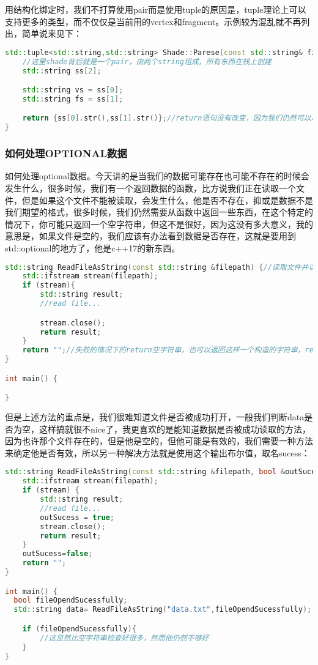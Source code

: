 用结构化绑定时，我们不打算使用pair而是使用tuple的原因是，tuple理论上可以支持更多的类型，而不仅仅是当前用的vertex和fragment。示例较为混乱就不再列出，简单说来见下：

\begin{lstlisting}[language=c++]
std::tuple<std::string,std::string> Shade::Parese(const std::string& filePath) {
    //这里shade背后就是一个pair，由两个string组成，所有东西在栈上创建
    std::string ss[2];

    std::string vs = ss[0];
    std::string fs = ss[1];

    return {ss[0].str(),ss[1].str()};//return语句没有改变，因为我们仍然可以以完全相同方式构造tuple
}
\end{lstlisting}


\subsubsection{如何处理OPTIONAL数据}

如何处理{\ncodestyle optional}数据。今天讲的是当我们的数据可能存在也可能不存在的时候会发生什么，很多时候，我们有一个返回数据的函数，比方说我们正在读取一个文件，但是如果这个文件不能被读取，会发生什么，他是否不存在，抑或是数据不是我们期望的格式，很多时候，我们仍然需要从函数中返回一些东西，在这个特定的情况下，你可能只返回一个空字符串，但这不是很好，因为这没有多大意义，我的意思是，如果文件是空的，我们应该有办法看到数据是否存在，这就是要用到{\ncodestyle std::optional}的地方了，他是c++17的新东西。

\begin{lstlisting}[language=c++]
std::string ReadFileAsString(const std::string &filepath) {//读取文件并以字符串方式来返回整个文件
    std::ifstream stream(filepath);
    if (stream){
        std::string result;
        //read file...

        stream.close();
        return result;
    }
    return "";//失败的情况下的return空字符串，也可以返回这样一个构造的字符串，return std::string();
}

int main() {

}
\end{lstlisting}

但是上述方法的重点是，我们很难知道文件是否被成功打开，一般我们判断data是否为空，这样搞就很不nice了，我更喜欢的是能知道数据是否被成功读取的方法，因为也许那个文件存在的，但是他是空的，但他可能是有效的，我们需要一种方法来确定他是否有效，所以另一种解决方法就是使用这个输出布尔值，取名sucess：

\begin{lstlisting}[language=c++]
std::string ReadFileAsString(const std::string &filepath, bool &outSucess) {
    std::ifstream stream(filepath);
    if (stream) {
        std::string result;
        //read file...
        outSucess = true;
        stream.close();
        return result;
    }
    outSucess=false;
    return "";
}

int main() {
  bool fileOpendSucessfully;
  std::string data= ReadFileAsString("data.txt",fileOpendSucessfully);

    if (fileOpendSucessfully){
        //这显然比空字符串检查好很多，然而他仍然不够好
    }
}
\end{lstlisting}

